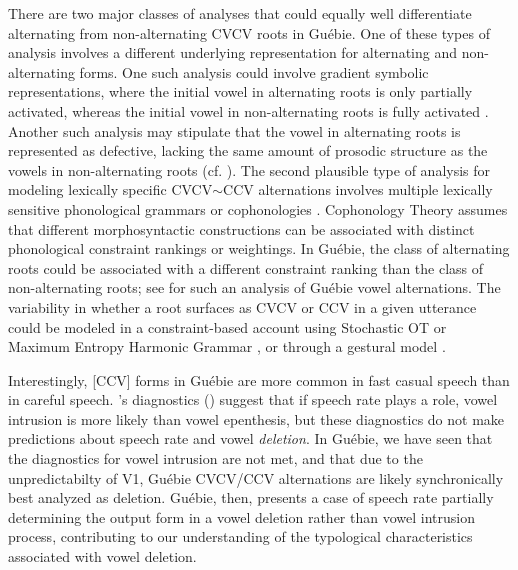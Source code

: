 \documentclass[output=paper,colorlinks,citecolor=brown]{langscibook}
\begin{document}
There are two major classes of analyses that could equally well differentiate alternating from non-alternating CVCV roots in Guébie. One of these types of analysis involves a different underlying representation for alternating and non-alternating forms. One such analysis could involve gradient symbolic representations, where the initial vowel in alternating roots is only partially activated, whereas the initial vowel in non-alternating roots is fully activated \citep{Goldrick&Smolensky:2016}. Another such analysis may stipulate that the vowel in alternating roots is represented as defective, lacking the same amount of prosodic structure as the vowels in non-alternating roots (cf. \cite{Zimmermann:2013, Zimmermann:2016}). The second plausible type of analysis for modeling lexically specific CVCV$\sim$CCV alternations involves multiple lexically sensitive phonological grammars or cophonologies \citep{Orgun:1996, Inkelas:1997, Anttila:2002, Inkelas&Zoll, InkelasZoll:2007}. Cophonology Theory assumes that different morphosyntactic constructions can be associated with distinct phonological constraint rankings or weightings. In Guébie, the class of alternating roots could be associated with a different constraint ranking than the class of non-alternating roots; see \citet{Sande:Language} for such an analysis of Guébie vowel alternations. The variability in whether a root surfaces as CVCV or CCV in a given utterance could be  modeled in a constraint-based account using Stochastic OT \citep{Boersma:1998, BoersmaHayes2001} or Maximum Entropy Harmonic Grammar \citep{GoldwaterJohnson:2003}, or through a gestural model \citep{Hall:2003, Hall2006}.

Interestingly, [CCV] forms in Guébie are more common in fast casual speech than in careful speech. \citeauthor{Hall2006}'s diagnostics (\citeyear{Hall2006}) suggest that if speech rate plays a role, vowel intrusion is more likely than vowel epenthesis, but these diagnostics do not make predictions about speech rate and vowel \textit{deletion}. In Guébie, we have seen that the diagnostics for vowel intrusion are not met, and that due to the unpredictabilty of V1, Guébie CVCV\slash CCV alternations are likely synchronically best analyzed as deletion. Guébie, then, presents a case of speech rate partially determining the output form in a vowel deletion rather than vowel intrusion process, contributing to our understanding of the typological characteristics associated with vowel deletion.
\end{document}
